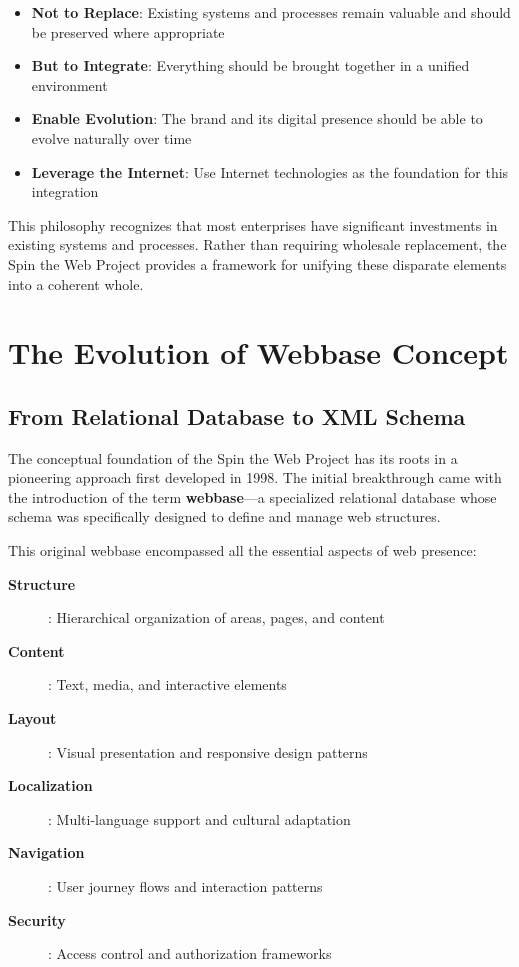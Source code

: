 \begin{itemize}
\item \textbf{Not to Replace}: Existing systems and processes remain valuable and should be preserved where appropriate
\item \textbf{But to Integrate}: Everything should be brought together in a unified environment
\item \textbf{Enable Evolution}: The brand and its digital presence should be able to evolve naturally over time
\item \textbf{Leverage the Internet}: Use Internet technologies as the foundation for this integration
\end{itemize}

This philosophy recognizes that most enterprises have significant investments in existing systems and processes. Rather than requiring wholesale replacement, the Spin the Web Project provides a framework for unifying these disparate elements into a coherent whole.

\section{The Evolution of Webbase Concept}

\subsection{From Relational Database to XML Schema}

The conceptual foundation of the Spin the Web Project has its roots in a pioneering approach first developed in 1998. The initial breakthrough came with the introduction of the term \textbf{webbase}—a specialized relational database whose schema was specifically designed to define and manage web structures.

This original webbase encompassed all the essential aspects of web presence:

\begin{description}
\item[\textbf{Structure}]: Hierarchical organization of areas, pages, and content
\item[\textbf{Content}]: Text, media, and interactive elements
\item[\textbf{Layout}]: Visual presentation and responsive design patterns
\item[\textbf{Localization}]: Multi-language support and cultural adaptation
\item[\textbf{Navigation}]: User journey flows and interaction patterns
\item[\textbf{Security}]: Access control and authorization frameworks
\end{description}

